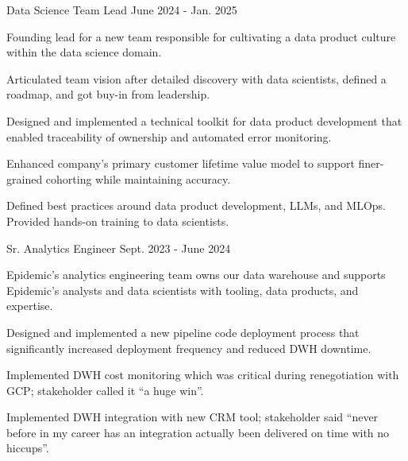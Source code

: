 \begin{cventries}
  \vspace{-1.0mm}
  \cventry
    {Data Science Team Lead} %
    {} %
    {} %
    {June 2024 - Jan. 2025} %
    {
    Founding lead for a new team responsible for cultivating a data product culture within the data science domain.
    \vspace{5.0mm}
      \begin{cvitems} %
        \item {Articulated team vision after detailed discovery with data scientists, defined a roadmap, and got buy-in from leadership. }
        \item {Designed and implemented a technical toolkit for data product development that enabled traceability of ownership and automated error monitoring. }
        \item {Enhanced company's primary customer lifetime value model to support finer-grained cohorting while maintaining accuracy. }
        \item {Defined best practices around data product development, LLMs, and MLOps. Provided hands-on training to data scientists. }
      \end{cvitems}
    }

  \vspace{-1.0mm}
  \cventry
    {Sr. Analytics Engineer} %
    {} %
    {} %
    {Sept. 2023 - June 2024} %
    {
    Epidemic's analytics engineering team owns our data warehouse and supports Epidemic's analysts
    and data scientists with tooling, data products, and expertise.
    \vspace{5.0mm}
      \begin{cvitems} %
        \item {Designed and implemented a new pipeline code deployment process that significantly increased deployment frequency and reduced DWH downtime.}
        \item {Implemented DWH cost monitoring which was critical during renegotiation with GCP; stakeholder called it “a huge win”.}
        \item {Implemented DWH integration with new CRM tool; stakeholder said “never before in my career has an integration actually been delivered on time with no hiccups”.}
      \end{cvitems}
    }




\end{cventries}

